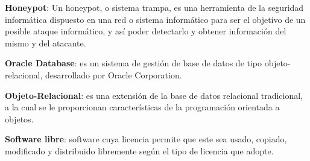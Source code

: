\textbf{Honeypot}: Un honeypot, o sistema trampa, es una herramienta de la seguridad informática dispuesto en una red o sistema informático para ser el objetivo de un posible ataque informático, y así poder detectarlo y obtener información del mismo y del atacante.
\bigskip

\textbf{Oracle Database}: es un sistema de gestión de base de datos de tipo objeto-relacional, desarrollado por Oracle Corporation.
\bigskip

 \textbf{Objeto-Relacional}: es una extensión de la base de datos relacional tradicional, a la cual se le proporcionan características de la programación orientada a objetos.
\bigskip

\textbf{Software libre}: software cuya licencia permite que este sea usado, copiado, modificado y distribuido libremente según el tipo de licencia que adopte.
\bigskip
